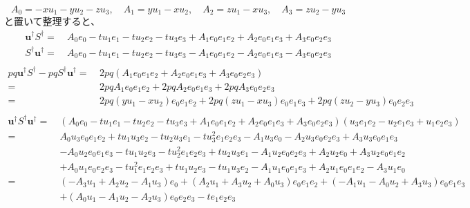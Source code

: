 \documentclass[a4paper,12pt,notitlepage]{jsreport}
\begin{document}
\begin{equation}
  A_0 = - x u_1 - y u_2 - z u_3 , \quad
  A_1 = y u_1 - x u_2 , \quad
  A_2 = z u_1 - x u_3 , \quad
  A_3 = z u_2 - y u_3
\end{equation}
と置いて整理すると、
\begin{equation}
  \begin{split}
    \bm{u}^\dag S^\dag = ~ & A_0 e_0 - t u_1 e_1 - t u_2 e_2 - t u_3 e_3 + A_1 e_0e_1e_2 + A_2 e_0e_1e_3 + A_3 e_0e_2e_3\\
    S^\dag \bm{u}^\dag = ~ & A_0 e_0 - t u_1 e_1 - t u_2 e_2 - t u_3 e_3 - A_1 e_0e_1e_2 - A_2 e_0e_1e_3 - A_3 e_0e_2e_3\\
  \end{split}
\end{equation}
\begin{equation}
  \begin{split}
    p q \bm{u}^\dag S^\dag - p q S^\dag \bm{u}^\dag = ~ & 2 p q (A_1 e_0e_1e_2 + A_2 e_0e_1e_3 + A_3 e_0e_2e_3) \\
    = ~ & 2 p q A_1 e_0e_1e_2 + 2 p q A_2 e_0e_1e_3 + 2 p q A_3 e_0e_2e_3 \\
    = ~ & 2 p q (y u_1 - x u_2) e_0e_1e_2 + 2 p q (z u_1 - x u_3) e_0e_1e_3 + 2 p q (z u_2 - y u_3) e_0e_2e_3 \\
  \end{split}
\end{equation}
\begin{equation}
  \begin{split}
    \bm{u}^\dag S^\dag \bm{u}^\dag
    = ~ & (A_0 e_0 - t u_1 e_1 - t u_2 e_2 - t u_3 e_3 + A_1 e_0e_1e_2 + A_2 e_0e_1e_3 + A_3 e_0e_2e_3)
    (u_3 e_1e_2 - u_2 e_1e_3 + u_1 e_2e_3) \\
    = ~ & A_0 u_3 e_0e_1e_2 + t u_1 u_3 e_2 - t u_2 u_3 e_1 - t u_3^2 e_1e_2e_3 - A_1 u_3 e_0 - A_2 u_3 e_0e_2e_3 + A_3 u_3 e_0e_1e_3 \\
    & - A_0 u_2 e_0e_1e_3 - t u_1 u_2 e_3 - t u_2^2 e_1e_2e_3 + t u_2 u_3 e_1 - A_1 u_2 e_0e_2e_3 + A_2 u_2 e_0 + A_3 u_2 e_0e_1e_2 \\
    & + A_0 u_1 e_0e_2e_3 - t u_1^2 e_1e_2e_3 + t u_1 u_2 e_3 - t u_1 u_3 e_2 - A_1 u_1 e_0e_1e_3 + A_2 u_1 e_0e_1e_2 - A_3 u_1 e_0 \\
    = ~ & (- A_3 u_1 + A_2 u_2 - A_1 u_3) e_0 + (A_2 u_1 + A_3 u_2 + A_0 u_3) e_0e_1e_2 + (- A_1 u_1 - A_0 u_2 + A_3 u_3) e_0e_1e_3 \\
    & + (A_0 u_1 - A_1 u_2 - A_2 u_3) e_0e_2e_3 - t e_1e_2e_3 \\
  \end{split}
\end{equation}
\end{document}
